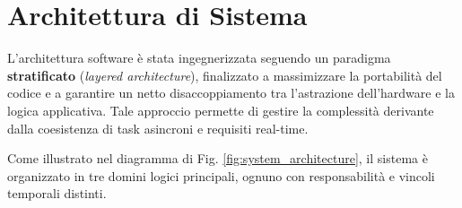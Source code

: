 \newpage
\section{Architettura di Sistema}

L'architettura software è stata ingegnerizzata seguendo un paradigma \textbf{stratificato} (\textit{layered architecture}), finalizzato a massimizzare la portabilità del codice e a garantire un netto disaccoppiamento tra l'astrazione dell'hardware e la logica applicativa. Tale approccio permette di gestire la complessità derivante dalla coesistenza di task asincroni e requisiti real-time.

Come illustrato nel diagramma di Fig. \ref{fig:system_architecture}, il sistema è organizzato in tre domini logici principali, ognuno con responsabilità e vincoli temporali distinti.

